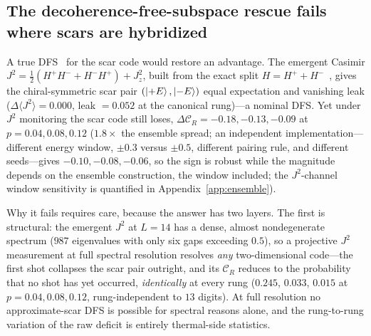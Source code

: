 \documentclass[a4paper,11pt,twocolumn,unpublished]{quantumarticle}
\newcommand{\CR}{\mathcal{C}_R}
\begin{document}
\subsection{The decoherence-free-subspace rescue fails where scars are
hybridized}
\label{sec:dfs}
A true DFS~\cite{Zanardi1997,Lidar1998} for the scar code would restore an
advantage. The emergent Casimir
$J^2=\tfrac12(H^+H^-+H^-H^+)+J_z^2$, built from the exact split
$H=H^++H^-$~\cite{Choi2019},
gives the chiral-symmetric scar pair $(\ket{+E},\ket{-E})$ equal expectation and
vanishing leak ($\Delta\langle J^2\rangle=0.000$, leak $=0.052$ at the
canonical rung)---a nominal DFS.
Yet under $J^2$ monitoring the scar code still loses, $\Delta\CR=-0.18,-0.13,
-0.09$ at $p=0.04,0.08,0.12$ ($1.8\times$ the ensemble spread; an independent
implementation---different energy window, $\pm0.3$ versus $\pm0.5$, different
pairing rule, and different seeds---gives $-0.10,-0.08,-0.06$, so the sign is
robust while the magnitude depends on the ensemble construction, the window
included; the $J^2$-channel window sensitivity is quantified in
Appendix~\ref{app:ensemble}).

Why it fails requires care, because the answer has two layers. The first is
structural: the emergent $J^2$ at $L=14$ has a dense, almost nondegenerate
spectrum ($987$ eigenvalues with only six gaps exceeding $0.5$), so a
projective $J^2$ measurement at full spectral resolution resolves \emph{any}
two-dimensional code---the first shot collapses the scar pair outright, and
its $\CR$ reduces to the probability that no shot has yet occurred,
\emph{identically} at every rung ($0.245$, $0.033$, $0.015$ at
$p=0.04,0.08,0.12$, rung-independent to $13$ digits). At full resolution no
approximate-scar DFS is possible for spectral reasons alone, and the
rung-to-rung variation of the raw deficit is entirely thermal-side
statistics.
\end{document}
